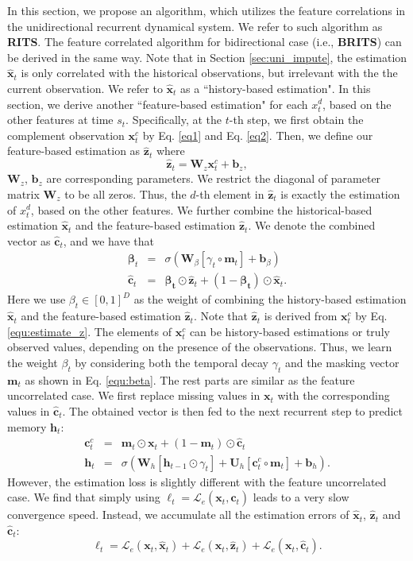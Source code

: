 \documentclass{article}
\newcommand{\rits}{\xspace{RITS}}
\newcommand{\methodname}{\xspace{BRITS}}
\newcommand{\x}{{\mathbf x}}
\newcommand{\z}{{\mathbf z}}
\newcommand{\h}{{\mathbf h}}
\newcommand{\m}{{\mathbf m}}
\newcommand{\bias}{{\mathbf b}}
\newcommand{\W}{{\mathbf W}}
\newcommand{\Ux}{{\mathbf U}}
\begin{document}
In this section, we propose an algorithm, which utilizes the feature correlations in the unidirectional recurrent dynamical system. We refer to such algorithm as {\bf \rits}. The feature correlated algorithm for bidirectional case (i.e., {\bf \methodname})  can be derived in the same way. Note that in Section \ref{sec:uni_impute}, the estimation $\hat{\x}_t$ is only correlated with the historical observations, but irrelevant with the the current observation. We refer to $\hat{\x}_t$ as a ``history-based estimation". In this section, we derive another ``feature-based estimation" for each $x_t^d$, based on the other features at time $s_t$. Specifically, at the $t$-th step, we first obtain the complement observation $\x^c_t$ by Eq. \eqref{eq1} and Eq. \eqref{eq2}. Then, we define our feature-based estimation as $\hat{\z}_t$ where 
\begin{equation}
\label{equ:estimate_z}
\hat{\z}_t = \W_z \x_t^c + \bias_z,
\end{equation}
$\W_z$, $\bias_z$ are corresponding parameters.
We restrict the diagonal of parameter matrix $\W_z$ to be all zeros. Thus, the $d$-th element in $\hat{\z}_t$ is exactly the estimation of $x_t^d$, based on the other features. We further combine the historical-based estimation $\hat{\x}_t$ and the feature-based estimation $\hat{\z}_t$. We denote the combined vector as $\hat{\mathbf{c}}_t$, and we have that
\begin{eqnarray}
\mathbf{\beta}_t &=&  \sigma(\W_{\beta} [\gamma_t \circ \m_t] +\bias_{\beta}) \label{equ:beta}\\
\hat{\mathbf{c}}_t &=& \mathbf{\beta_t}\odot \hat{\z}_t + (1 - \mathbf{\beta_t}) \odot \hat{\x}_t \label{equ:z_t^c}.
\end{eqnarray}
Here we use $\beta_t \in [0, 1]^D$ as the weight of combining the history-based estimation $\hat{\x}_t$ and the feature-based estimation $\hat{\z}_t$. Note that $\hat{\z}_t$ is derived from $\x_t^c$ by Eq. \eqref{equ:estimate_z}. The elements of $\x_t^c$ can be history-based estimations or truly observed values, depending on the presence of the observations. Thus, we learn the weight $\beta_t$ by considering both the temporal decay $\gamma_t$ and the masking vector $\m_t$ as shown in Eq. \eqref{equ:beta}.
The rest parts are similar as the feature uncorrelated case. We first replace missing values in $\x_t$ with the corresponding values in $\hat{\mathbf{c}}_t$. The obtained vector is then fed to the next recurrent step to predict memory $\h_t$:
\begin{eqnarray}
\mathbf{c}_t^c &=& \m_t \odot \x_t + (1 - \m_t) \odot \hat{\mathbf{c}}_t\\
\h_t &=& \sigma(\W_h [\h_{t - 1} \odot \gamma_t] + \Ux_h [{\mathbf{c}_t^c} \circ \m_t] + \bias_h).
\end{eqnarray}
However, the estimation loss is slightly different with the feature uncorrelated case. We find that simply using $\ell_t = \mathcal{L}_e(\x_t, \hat{\mathbf{c}}_t)$ leads to a very slow convergence speed. Instead, we accumulate all the estimation errors of $\hat{\x}_t$, $\hat{\z}_t$ and $\hat{\mathbf{c}}_t$:
$$\ell_t = \mathcal{L}_e(\x_t, \hat{\mathbf{x}}_t) + \mathcal{L}_e(\x_t, \hat{\mathbf{z}}_t) + \mathcal{L}_e(\x_t, \hat{\mathbf{c}}_t).$$
\end{document}
